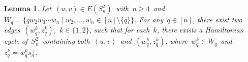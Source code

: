 \documentclass[12pt,a4paper]{amsart}
\newtheorem{lemma}[thm]{Lemma}
\theoremstyle{definition}
\begin{document}
	
	
	\begin{lemma}\label{10}
        Let~$(u,v)\in E(S_n^2)$~with~$n\ge4$~and~$W_q=\{qw_2w_3\cdots w_n\mid w_2,\ldots,w_n\in[n]\setminus\{q\}\}$. %
        For any~$q\in[n]$, there exist two edges~$(w_q^k,z_q^k)$,~$k\in\{1,2\}$, such that for each~$k$, there exists a Hamiltonian cycle of~$S_n^2$~containing both~$(u,v)$~and~$(w_q^k,z_q^k)$, where~$w_q^k\in W_q$~and~$z_q^k=w_q^ks_n^{+}$.

	\end{lemma}
\end{document}
